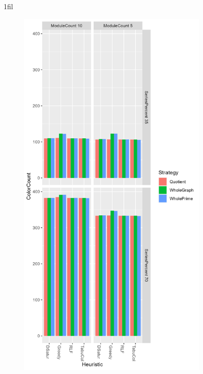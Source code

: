 \documentclass[a4paper]{article}
\makeatletter
\newcommand*{\centerfloat}{%
  \parindent \z@
  \leftskip \z@ \@plus 1fil \@minus \textwidth
  \rightskip\leftskip
  \parfillskip \z@skip}
\makeatother
\begin{document}
\newcommand{\figdesc}[0]{Graph coloring algorithm is on the x-axis, color/time is on the y-axis, staple colors represent the different strategies. }
\newcommand{\facfigdesc}[0]{\figdesc Result faceted by Module size and series percent. }

\begin{figure}[p]
\centerfloat
    \begin{subfigure}{.4\paperwidth}
        \includegraphics[width=\columnwidth]{Tables/1000.png}

\end{subfigure}
\end{figure}
\end{document}
